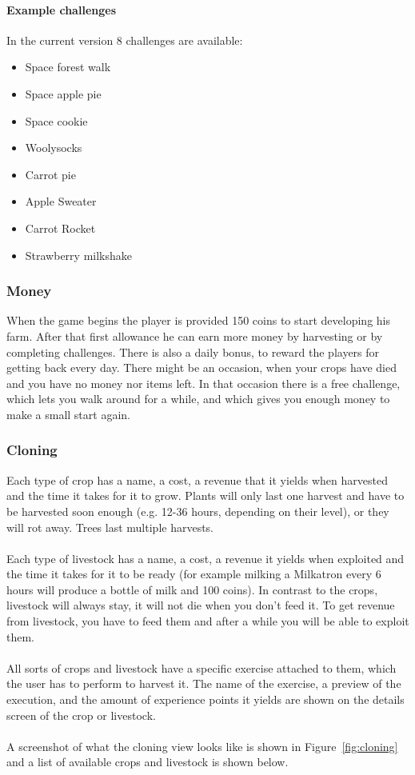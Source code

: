 \paragraph{Example challenges}
In the current version $8$ challenges are available:
\begin{itemize}
\item Space forest walk
\item Space apple pie
\item Space cookie
\item Woolysocks
\item Carrot pie
\item Apple Sweater
\item Carrot Rocket
\item Strawberry milkshake
\end{itemize}

\subsubsection{Money}
When the game begins the player is provided 150 coins to start developing his farm. After that first allowance he can earn more money by harvesting or by completing challenges. There is also a daily bonus, to reward the players for getting back every day. There might be an occasion, when your crops have died and you have no money nor items left. In that occasion there is a free challenge, which lets you walk around for a while, and which gives you enough money to make a small start again.

\subsubsection{Cloning}
Each type of crop has a name, a cost, a revenue that it yields when harvested and the time it takes for it to grow. Plants will only last one harvest and have to be harvested soon enough (e.g. 12-36 hours, depending on their level), or they will rot away. Trees last multiple harvests.
\\\\
Each type of livestock has a name, a cost, a revenue it yields when exploited and the time it takes for it to be ready (for example milking a Milkatron every 6 hours will produce a bottle of milk and 100 coins). In contrast to the crops, livestock will always stay, it will not die when you don't feed it. To get revenue from livestock, you have to feed them and after a while you will be able to exploit them.
\\\\
All sorts of crops and livestock have a specific exercise attached to them, which the user has to perform to harvest it. The name of the exercise, a preview of the execution, and the amount of experience points it yields are shown on the details screen of the crop or livestock.
\\\\
A screenshot of what the cloning view looks like is shown in Figure~\ref{fig:cloning} and a list of available crops and livestock is shown below.

